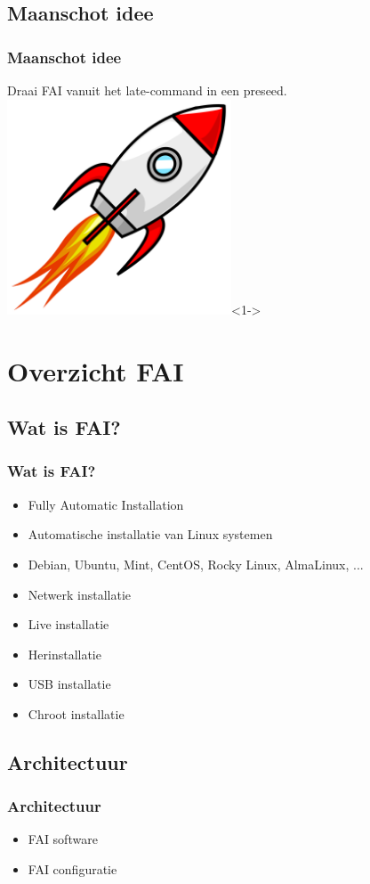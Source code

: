 \documentclass{beamer}
\begin{document}
\subsection{Maanschot idee}
\begin{frame}
\frametitle{Maanschot idee}
Draai FAI vanuit het late-command in een preseed.
\centering
\includegraphics[width=0.5\textwidth]{img/Cartoon_space_rocket.png}<1->
\end{frame}

\section{Overzicht FAI}

\subsection{Wat is FAI?}
\begin{frame}
\frametitle{Wat is FAI?}
\begin{itemize}
  \item Fully Automatic Installation
  \item Automatische installatie van Linux systemen
  \item Debian, Ubuntu, Mint, CentOS, Rocky Linux, AlmaLinux, ...
  \item Netwerk installatie
  \item Live installatie
  \item Herinstallatie
  \item USB installatie
  \item Chroot installatie
\end{itemize}
\end{frame}

\subsection{Architectuur}
\begin{frame}
\frametitle{Architectuur}
\begin{itemize}
  \item FAI software
  \item FAI configuratie
\end{itemize}
\end{frame}
\end{document}
